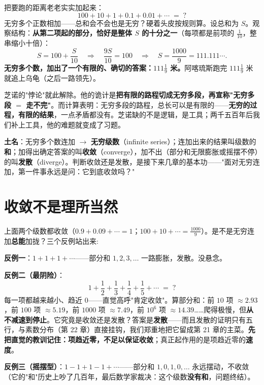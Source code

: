 把要跑的距离老老实实加起来：
\[
100 + 10 + 1 + 0.1 + 0.01 + \cdots \;=\; ?
\]
无穷多个正数相加——总和会不会也是无穷？硬着头皮按规则算。设总和为 $S$。观察结构：\textbf{从第二项起的部分，恰好是整体 $S$ 的十分之一}（每项都是前项的 $\tfrac1{10}$，整串缩小十倍）：
\[
S = 100 + \frac{S}{10} \quad\Longrightarrow\quad \frac{9S}{10} = 100 \quad\Longrightarrow\quad S = \frac{1000}{9} = 111.111\cdots .
\]
\textbf{无穷多个数，加出了一个有限的、确切的答案：$111\tfrac19$ 米。}阿喀琉斯跑完 $111\tfrac19$ 米就追上乌龟（之后一路领先）。

芝诺的"悖论"就此解除。他的诡计是\textbf{把有限的路程切成无穷多段，再宣称"无穷多段 $=$ 走不完"}。而计算表明：无穷多段的路程，总长可以是有限的——\textbf{无穷的过程，有限的结果}，一点矛盾都没有。芝诺缺的不是逻辑，是工具；两千五百年后我们补上工具，他的难题就变成了习题。

\begin{faming}
\textbf{土名}：无穷多个数连加 $\to$ \textbf{无穷级数}（infinite series）；连加出来的结果叫级数的\textbf{和}；加得出确定答案的叫\textbf{收敛}（converge），加不出（部分和无限膨胀或摇摆不停）的叫\textbf{发散}（diverge）。判断收敛还是发散，是接下来几章的基本功——"面对无穷连加，第一件事永远是问：它到底收敛吗？"
\end{faming}

\section{收敛不是理所当然}

上面两个级数都收敛（$0.9 + 0.09 + \cdots = 1$；$100+10+\cdots = \tfrac{1000}9$）。是不是无穷连加\textbf{总能}加拢？三个反例站出来:

\textbf{反例一}：$1 + 1 + 1 + \cdots$——部分和 $1, 2, 3, \dots$ 一路膨胀，发散。没悬念。

\textbf{反例二（最阴险）}：
\[
1 + \frac12 + \frac13 + \frac14 + \frac15 + \cdots \;=\; ?
\]
每一项都越来越小、趋近 $0$——直觉高呼"肯定收敛"。算部分和：前 $10$ 项 $\approx 2.93$，前 $100$ 项 $\approx 5.19$，前 $1000$ 项 $\approx 7.49$，前 $10^6$ 项 $\approx 14.39$……爬得极慢，但\textbf{从不减速到停止}。它究竟是收敛还是发散？答案是\textbf{发散}——而且发散的证明只有五行，与素数分布（第 22 章）直接挂钩，我们郑重地把它留成第 21 章的主菜。\textbf{先把直觉的教训记住：项趋近零，不足以保证收敛}；真正起作用的是项趋近零的\textbf{速度}。

\textbf{反例三（摇摆型）}：$1 - 1 + 1 - 1 + \cdots$——部分和 $1, 0, 1, 0, \dots$ 永远摆动，不收敛（它的"和"历史上吵了几百年，最后数学家裁决：这个级数\textbf{没有和}，问题终结）。

